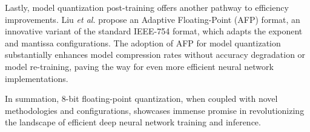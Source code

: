 Lastly, model quantization post-training offers another pathway to efficiency improvements. Liu \textit{et al.} \cite{liu2021improving} propose an Adaptive Floating-Point (AFP) format, an innovative variant of the standard IEEE-754 format, which adapts the exponent and mantissa configurations. The adoption of AFP for model quantization substantially enhances model compression rates without accuracy degradation or model re-training, paving the way for even more efficient neural network implementations.

In summation, 8-bit floating-point quantization, when coupled with novel methodologies and configurations, showcases immense promise in revolutionizing the landscape of efficient deep neural network training and inference.
